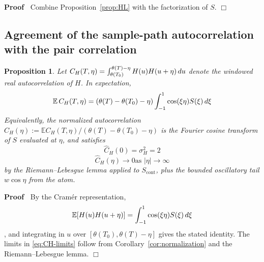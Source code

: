 \documentclass{article}
\newcommand{\assign}{:=}
\newenvironment{proof}{\noindent\textbf{Proof\ }}{\hspace*{\fill}$\Box$\medskip}
\newtheorem{proposition}{Proposition}
\begin{document}
\begin{proof}
  Combine Proposition~\ref{prop:HL} with the factorization of $S$.
\end{proof}

\subsection{Agreement of the sample-path autocorrelation with the pair
correlation}

\begin{proposition}
  \label{prop:CH-agreement}Let $C_H (T, \eta) = \int_{\theta (T_0)}^{\theta
  (T) - \eta} H (u) H (u + \eta)  \hspace{0.17em} du$ denote the windowed real
  autocorrelation of $H$. In expectation,
  \begin{equation}
    \mathbb{E} \hspace{0.17em} C_H (T, \eta) = (\theta (T) - \theta (T_0) -
    \eta)  \int_{- 1}^1 \cos (\xi \eta) S (\xi)  \hspace{0.17em} d \xi
  \end{equation}
  Equivalently, the normalized autocorrelation $\hat{C}_H (\eta) \assign
  \mathbb{E}C_H (T, \eta) / (\theta (T) - \theta (T_0) - \eta)$ is the Fourier
  cosine transform of $S$ evaluated at $\eta$, and satisfies
  \begin{equation}
    \hat{C}_H (0) = \sigma_H^2 = 2 \label{eq:CH-limits}
  \end{equation}
  \begin{equation}
    \hat{C}_H (\eta) \to 0 \text{as } | \eta | \to \infty
  \end{equation}
  by the Riemann--Lebesgue lemma applied to $S_{\mathrm{cont}}$, plus the
  bounded oscillatory tail $w \cos \eta$ from the atom.
\end{proposition}

\begin{proof}
  By the Cram{\'e}r representation,
  \begin{equation}
    \mathbb{E} [H (u) H (u + \eta)] = \int_{- 1}^1 \cos (\xi \eta) S (\xi) 
    \hspace{0.17em} d \xi
  \end{equation}
  , and integrating in $u$ over $[\theta (T_0), \theta (T) - \eta]$ gives the
  stated identity. The limits in \eqref{eq:CH-limits} follow from
  Corollary~\ref{cor:normalization} and the Riemann--Lebesgue lemma.
\end{proof}
\end{document}
